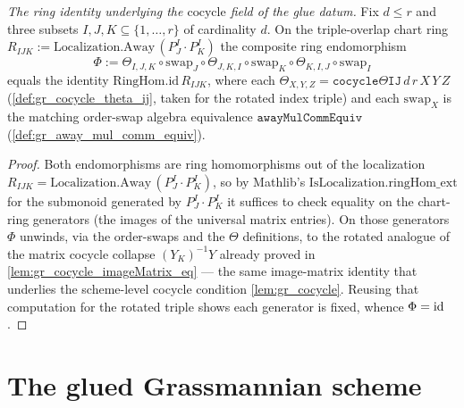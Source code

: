 \begin{lemma}[The rotated triple-overlap ring cocycle identity \(\Phi = \id\)]\leanok
  \label{lem:gr_cocycle_phi_id}
  \textit{The ring identity underlying the \(\mathrm{cocycle}\) field of the glue datum.}
  Fix \(d \le r\) and three subsets \(I,J,K \subseteq \{1,\dots,r\}\) of cardinality \(d\). On the
  triple-overlap chart ring \(R_{IJK} := \mathrm{Localization.Away}\,(P^I_J\cdot P^I_K)\)
  the composite ring endomorphism
  \[
    \Phi := \Theta_{I,J,K} \circ \mathrm{swap}_J \circ \Theta_{J,K,I} \circ \mathrm{swap}_K
            \circ \Theta_{K,I,J} \circ \mathrm{swap}_I
  \]
  equals the identity \(\mathrm{RingHom.id}\,R_{IJK}\), where each \(\Theta_{X,Y,Z} =
  \mathtt{cocycleΘIJ}\,d\,r\,X\,Y\,Z\) (\cref{def:gr_cocycle_theta_ij}, taken for the rotated index
  triple) and each \(\mathrm{swap}_X\) is the matching order-swap algebra equivalence
  \(\mathtt{awayMulCommEquiv}\) (\cref{def:gr_away_mul_comm_equiv}).
\end{lemma}
\begin{proof}
  \leanok
  Both endomorphisms are ring homomorphisms out of the localization
  \(R_{IJK} = \mathrm{Localization.Away}\,(P^I_J\cdot P^I_K)\), so by Mathlib's
  \(\mathrm{IsLocalization.ringHom\_ext}\) for the submonoid generated by
  \(P^I_J\cdot P^I_K\) it suffices to
  check equality on the chart-ring generators (the images of the universal matrix entries). On those
  generators \(\Phi\) unwinds, via the order-swaps and the \(\Theta\) definitions, to the rotated
  analogue of the matrix cocycle collapse \((Y_K)^{-1}Y\) already proved in
  \cref{lem:gr_cocycle_imageMatrix_eq} — the same image-matrix identity that underlies the scheme-level
  cocycle condition \cref{lem:gr_cocycle}. Reusing that computation for the rotated triple shows each
  generator is fixed, whence \(\Phi = \id\).
\end{proof}

\section{The glued Grassmannian scheme}
\label{sec:gr_glued}

